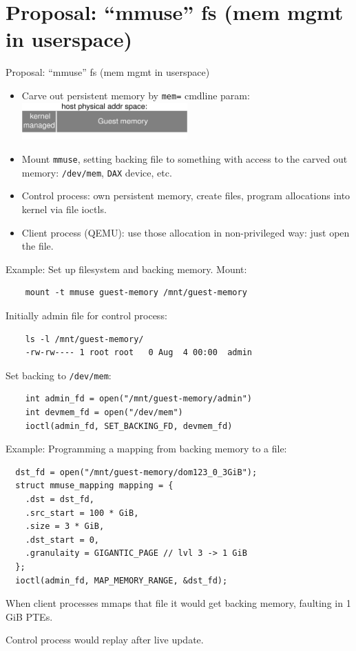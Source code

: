 \documentclass{beamer}
\begin{document}
\section{Proposal: ``mmuse'' fs (mem mgmt in userspace)}
\begin{frame}{Proposal: ``mmuse'' fs (mem mgmt in userspace)}
  \begin{itemize}
    \item Carve out persistent memory by \texttt{mem=} cmdline param:
    \includegraphics[width=0.5\textwidth]{memmac-memory}
  \item Mount \texttt{mmuse}, setting backing file to something with access to the carved out memory: \texttt{/dev/mem}, \texttt{DAX} device, etc.
    \item Control process: own persistent memory, create files, program allocations into kernel via file ioctls.
    \item Client process (QEMU): use those allocation in non-privileged way: just open the file.
  \end{itemize}
\end{frame}

\begin{frame}[fragile]
  Example: Set up filesystem and backing memory. Mount:

  \begin{verbatim}
    mount -t mmuse guest-memory /mnt/guest-memory
  \end{verbatim}
  \vspace{1cm}
  Initially admin file for control process:
  \begin{verbatim}
    ls -l /mnt/guest-memory/
    -rw-rw---- 1 root root   0 Aug  4 00:00  admin
  \end{verbatim}
  \vspace{0.8cm}
  Set backing to \texttt{/dev/mem}:
  \begin{verbatim}
    int admin_fd = open("/mnt/guest-memory/admin")
    int devmem_fd = open("/dev/mem")
    ioctl(admin_fd, SET_BACKING_FD, devmem_fd)
  \end{verbatim}
\end{frame}

\begin{frame}[fragile]
  Example: Programming a mapping from backing memory to a file:
  \begin{verbatim}
  dst_fd = open("/mnt/guest-memory/dom123_0_3GiB");
  struct mmuse_mapping mapping = {
    .dst = dst_fd,
    .src_start = 100 * GiB,
    .size = 3 * GiB,
    .dst_start = 0,
    .granulaity = GIGANTIC_PAGE // lvl 3 -> 1 GiB
  };
  ioctl(admin_fd, MAP_MEMORY_RANGE, &dst_fd);
  \end{verbatim}

  When client processes mmaps that file it would get backing memory, faulting in 1 GiB PTEs.

  Control process would replay after live update.
\end{frame}
\end{document}
